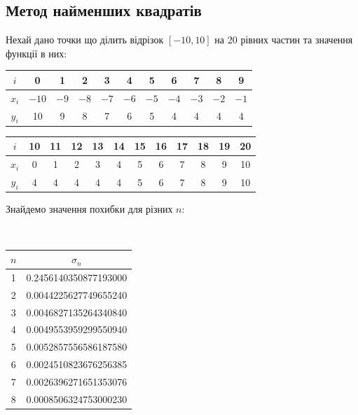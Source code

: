 \subsection{Метод найменших квадратів}

Нехай дано точки що ділить відрізок $[-10, 10]$ на 20 рівних частин та значення функції в них:

\begin{table}[H]
    \centering
    \begin{tabular}{|c|c|c|c|c|c|c|c|c|c|c|} \hline
        $i$ & 0 & 1 & 2 & 3 & 4 & 5 & 6 & 7 & 8 & 9 \\ \hline
        $x_i$ & $-10$ & $-9$ & $-8$ & $-7$ & $-6$ & $-5$ & $-4$ & $-3$ & $-2$ & $-1$ \\ \hline 
        $y_i$ & 10 & 9 & 8 & 7 & 6 & 5 & 4 & 4 & 4 & 4 \\ \hline
    \end{tabular}
    \break
    \hfill 
    \break
    \begin{tabular}{|c|c|c|c|c|c|c|c|c|c|c|c|} \hline
        $i$ & 10 & 11 & 12 & 13 & 14 & 15 & 16 & 17 & 18 & 19 & 20 \\ \hline
        $x_i$ & 0 & 1 & 2 & 3 & 4 & 5 & 6 & 7 & 8 & 9 & 10 \\ \hline
        $y_i$ & 4 & 4 & 4 & 4 & 4 & 5 & 6 & 7 & 8 & 9 & 10 \\ \hline
    \end{tabular}
\end{table}

Знайдемо значення похибки для різних $n$:

\begin{table}[H]
    \tt
    \centering
    \begin{tabular}{|c|c|} \hline
        $n$ & $\sigma_n$ \\ \hline
        1 & 0.2456140350877193000 \\ \hline
        2 & 0.0044225627749655240 \\ \hline
        3 & 0.0046827135264340840 \\ \hline
        4 & 0.0049553959299550940 \\ \hline
        5 & 0.0052857556586187580 \\ \hline
        6 & 0.0024510823676256385 \\ \hline
        7 & 0.0026396271651353076 \\ \hline
        8 & 0.0008506324753000230 \\ \hline
    \end{tabular}
\end{table}

